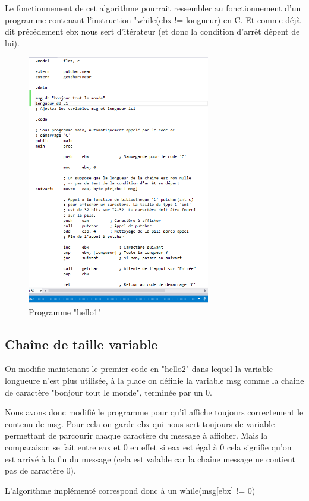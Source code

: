 \documentclass[11pt]{report}
\begin{document}
Le fonctionnement de cet algorithme pourrait ressembler au fonctionnement d'un programme contenant l'instruction "while(ebx != longueur) en C. Et comme déjà dit précédement ebx nous sert d'itérateur (et donc la condition d'arrêt dépent de lui).


\begin{figure}[ht]
\includegraphics[width=8cm]{Capture5.PNG}
\caption{Programme "hello1"}
\end{figure}


\subsection{Chaîne de taille variable}

On modifie maintenant le premier code en "hello2" dans lequel la variable longueure n'est plus utilisée, à la place on définie la variable msg comme la chaine de caractère "bonjour tout le monde", terminée par un 0.

Nous avons donc modifié le programme pour qu'il affiche toujours correctement le contenu de msg. Pour cela on garde ebx qui nous sert toujours de variable permettant de parcourir chaque caractère du message à afficher. Mais la comparaison se fait entre eax et 0 en effet si eax est égal à 0 cela signifie qu'on est arrivé à la fin du message (cela est valable car la chaîne message ne contient pas de caractère 0).

L'algorithme implémenté correspond donc à un while(msg[ebx] != 0)
\end{document}
